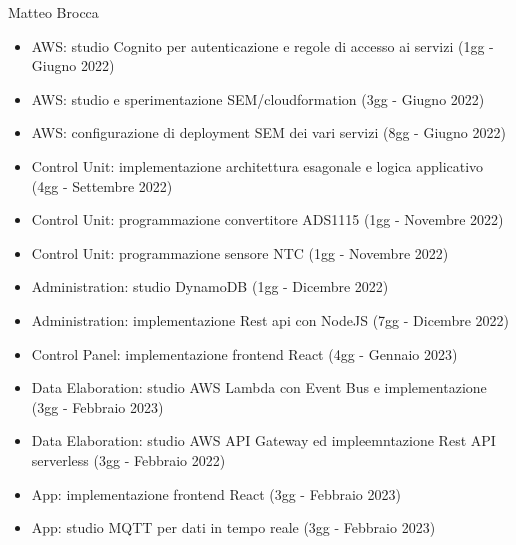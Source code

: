 Matteo Brocca
\begin{itemize}
    \item AWS: studio Cognito per autenticazione e regole di accesso ai servizi (1gg - Giugno 2022) 
    \item AWS: studio e sperimentazione SEM/cloudformation (3gg - Giugno 2022) 
    \item AWS: configurazione di deployment SEM dei vari servizi (8gg - Giugno 2022) 
    \item Control Unit: implementazione architettura esagonale e logica applicativo (4gg - Settembre 2022)
    \item Control Unit: programmazione convertitore ADS1115 (1gg - Novembre 2022)
    \item Control Unit: programmazione sensore NTC (1gg - Novembre 2022)
    \item Administration: studio DynamoDB (1gg - Dicembre 2022)
    \item Administration: implementazione Rest api con NodeJS (7gg - Dicembre 2022) 
    \item Control Panel: implementazione frontend React (4gg - Gennaio 2023) 
    \item Data Elaboration: studio AWS Lambda con Event Bus e implementazione (3gg - Febbraio 2023)
    \item Data Elaboration: studio AWS API Gateway ed impleemntazione Rest API serverless (3gg - Febbraio 2022)
    \item App: implementazione frontend React (3gg - Febbraio 2023) 
    \item App: studio MQTT per dati in tempo reale (3gg - Febbraio 2023) 
\end{itemize}

